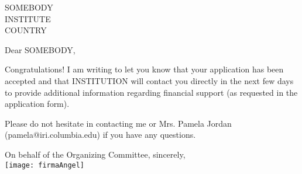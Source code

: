 \documentclass[
  fontsize=12pt,
  paper=a4,
   headsepline=false,
  footsepline=true,
  parskip=full, %
  firsthead=true, %
  enlargefirstpage=on,    %
  fromalign=right,        %
  fromphone=off,           %
  fromrule=false, %
  fromemail=true,           %
  addrfield=true,           %
  backaddress=true,         %
  addrfield=true,
  backaddress=false, %
  subject=beforeopening,
  subject=left,
  subject=titled, %
  foldmarks=on,           %
]{scrlttr2}
\begin{document}
  \begin{letter}{{SOMEBODY\\INSTITUTE\\COUNTRY}}
    \opening{Dear SOMEBODY,}
    Congratulations! I am writing to let you know that your application has been accepted and that INSTITUTION 
    will contact you directly in the next few days to provide additional information regarding  financial support (as requested in the application 
    form).
    
    Please do not hesitate in contacting me or Mrs. Pamela Jordan (pamela@iri.columbia.edu) if you have any questions.
   

\closing{On behalf of the Organizing Committee, sincerely,\\ \vspace{1cm} {\texttt{[image: firmaAngel]}}}

      \end{letter}
\end{document}
